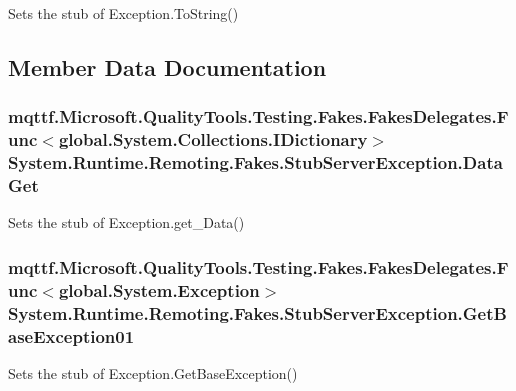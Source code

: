 Sets the stub of Exception.\-To\-String()



\subsection{Member Data Documentation}
\hypertarget{class_system_1_1_runtime_1_1_remoting_1_1_fakes_1_1_stub_server_exception_a998edd590276baef35823f16f9757d67}{
\subsubsection[{Data\-Get}]{\setlength{\rightskip}{0pt plus 5cm}mqttf.\-Microsoft.\-Quality\-Tools.\-Testing.\-Fakes.\-Fakes\-Delegates.\-Func$<$global.\-System.\-Collections.\-I\-Dictionary$>$ System.\-Runtime.\-Remoting.\-Fakes.\-Stub\-Server\-Exception.\-Data\-Get}}\label{class_system_1_1_runtime_1_1_remoting_1_1_fakes_1_1_stub_server_exception_a998edd590276baef35823f16f9757d67}


Sets the stub of Exception.\-get\-\_\-\-Data()

\hypertarget{class_system_1_1_runtime_1_1_remoting_1_1_fakes_1_1_stub_server_exception_a2f0c51be13a8619a268f692e68b1a157}{
\subsubsection[{Get\-Base\-Exception01}]{\setlength{\rightskip}{0pt plus 5cm}mqttf.\-Microsoft.\-Quality\-Tools.\-Testing.\-Fakes.\-Fakes\-Delegates.\-Func$<$global.\-System.\-Exception$>$ System.\-Runtime.\-Remoting.\-Fakes.\-Stub\-Server\-Exception.\-Get\-Base\-Exception01}}\label{class_system_1_1_runtime_1_1_remoting_1_1_fakes_1_1_stub_server_exception_a2f0c51be13a8619a268f692e68b1a157}


Sets the stub of Exception.\-Get\-Base\-Exception()

